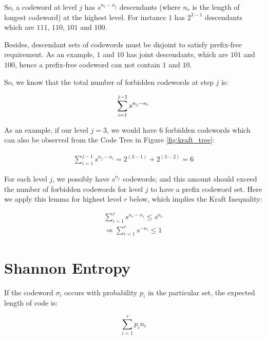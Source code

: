 \documentclass[11pt]{article}
\begin{document}
So, a codeword at level $j$ has $s^{n_{r}-n_{j}}$ descendants (where $n_{r}$ is the length of longest codeword) at the highest level. For instance $1$ has $2^{3-1}$ descendants which are $111$, $110$, $101$ and $100$.

Besides, descendant sets of codewords must be disjoint to satisfy prefix-free requirement. As an example, $1$ and $10$ has joint descendants, which are $101$ and $100$, hence a prefix-free codeword can not contain $1$ and $10$.

So, we know that the total number of forbidden codewords at step $j$ is:

\begin{equation} \label{eq1}
\sum_{i=1}^{j-1} s^{n_j - n_i} \\
\end{equation}

As an example, if our level $j=3$, we would have 6 forbidden codewords which can also be observed from the Code Tree in Figure \ref{fig:kraft_tree}:

\begin{equation} \label{eq1}
\begin{split}
\sum_{i=1}^{j-1} s^{n_j - n_i} = 2^{(3-1)} + 2^{(3-2)} = 6
\end{split}
\end{equation}

For each level $j$, we possibly have $s^{n_j}$ codewords; and this amount should exceed the number of forbidden codewords for level $j$ to have a prefix codeword set. Here we apply this lemma for highest level $r$ below, which implies the Kraft Inequality:

\begin{equation} \label{eq1}
\begin{split}
\sum_{i=1}^r s^{n_r - n_i} \leq s^{n_r} \\
 \Rightarrow \sum_{i=1}^{r} s^{-n_{i}} \leq 1
\end{split}
\end{equation}

\section{Shannon Entropy}

If the codeword $\sigma_{i}$ occurs with probability $p_{i}$ in the particular set, the expected length of code is: 

\begin{equation}
\sum_{i=1}^r p_{i}n_{i}
\end{equation}
\end{document}
